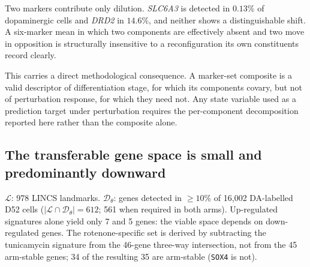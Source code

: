 \documentclass[5p,times,twocolumn]{elsarticle}
\begin{document}
Two markers contribute only dilution. \textit{SLC6A3} is detected in $0.13\%$ of
dopaminergic cells and \textit{DRD2} in $14.6\%$, and neither shows a
distinguishable shift. A six-marker mean in which two components are effectively
absent and two move in opposition is structurally insensitive to a
reconfiguration its own constituents record clearly.

This carries a direct methodological consequence. A marker-set composite is a
valid descriptor of differentiation stage, for which its components covary, but
not of perturbation response, for which they need not. Any state variable used
as a prediction target under perturbation requires the per-component
decomposition reported here rather than the composite alone.

\subsection{\textbf{The transferable gene space is small and predominantly downward}}

\begin{table}[!htbp]
  \centering
  \caption{Transferable gene space: successive intersection sizes.}
  \label{tab:genespace}
  \begin{minipage}{\linewidth}\footnotesize
  $\mathcal{L}$: 978 LINCS landmarks. $\mathcal{D}_\theta$: genes detected in $\geq 10\%$ of 16{,}002 DA-labelled D52 cells ($|\mathcal{L}\cap\mathcal{D}_\theta| = 612$; 561 when required in both arms). Up-regulated signatures alone yield only 7 and 5 genes: the viable space depends on down-regulated genes. The rotenone-specific set is derived by subtracting the tunicamycin signature from the 46-gene three-way intersection, not from the 45 arm-stable genes; 34 of the resulting 35 are arm-stable (\texttt{SOX4} is not).
  \end{minipage}
\end{table}
\end{document}
